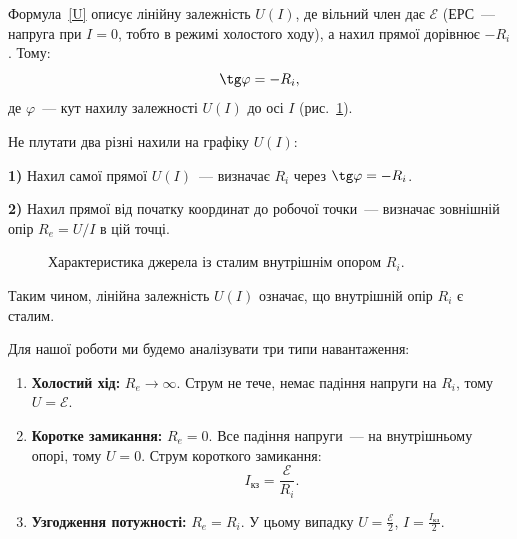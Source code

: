 Формула~\eqref{U} описує лінійну залежність $U(I)$, де вільний член дає $\mathcal{E}$ (ЕРС~--- напруга при $I=0$, тобто в режимі холостого ходу), а нахил прямої дорівнює $-R_i$. Тому:
\begin{equation}\label{tan}
	\tg\varphi = - R_i,
\end{equation}
де $\varphi$~--- кут нахилу залежності $U(I)$ до осі $I$ (рис.~\ref{pic2}).

\begin{NoteBox}
Не плутати два різні нахили на графіку $U(I)$:\par
\textbf{1)} Нахил самої прямої $U(I)$~--- визначає $R_i$ через $\tg\varphi = -R_i$.\par
\textbf{2)} Нахил прямої від початку координат до робочої точки~--- визначає зовнішній опір $R_e = U/I$ в цій точці.
\end{NoteBox}

\begin{figure}[h!]\centering
	\caption{Характеристика джерела із сталим внутрішнім опором $R_i$.}
	\label{pic2}
\end{figure}

Таким чином, лінійна залежність $U(I)$ означає, що внутрішній опір $R_i$ є сталим.

Для нашої роботи ми будемо аналізувати три типи навантаження:

\begin{enumerate}
	\item \textbf{Холостий хід:} $R_e \to \infty$. Струм не тече, немає падіння напруги на $R_i$, тому $U = \mathcal{E}$.
	\item \textbf{Коротке замикання:} $R_e=0$. Все падіння напруги~--- на внутрішньому опорі, тому $U = 0$. Струм короткого замикання:
	      \begin{equation}\label{short}
		      I_\text{кз}=\frac{\mathcal{E}}{R_i}.
	      \end{equation}
	\item \textbf{Узгодження потужності:} $R_e=R_i$. У цьому випадку $U = \frac{\mathcal{E}}{2}$, $I=\frac{I_\text{кз}}{2}$.
\end{enumerate}

